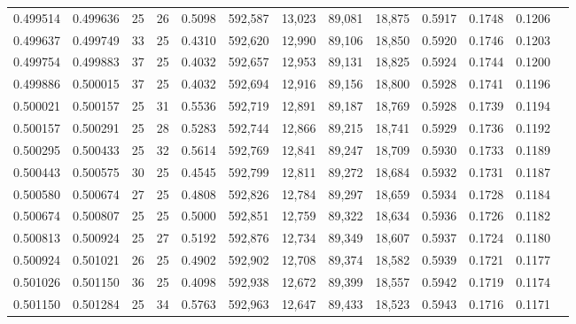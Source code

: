 \begin{tabular}{rrrrrrrrrrrrr}
0.499514 & 0.499636 &    25 &  26 &                                     0.5098 & 592,587 &  13,023 &  89,081 &  18,875 & 0.5917 & 0.1748 & 0.1206 \\
0.499637 & 0.499749 &    33 &  25 &                                     0.4310 & 592,620 &  12,990 &  89,106 &  18,850 & 0.5920 & 0.1746 & 0.1203 \\
0.499754 & 0.499883 &    37 &  25 &                                     0.4032 & 592,657 &  12,953 &  89,131 &  18,825 & 0.5924 & 0.1744 & 0.1200 \\
0.499886 & 0.500015 &    37 &  25 &                                     0.4032 & 592,694 &  12,916 &  89,156 &  18,800 & 0.5928 & 0.1741 & 0.1196 \\
0.500021 & 0.500157 &    25 &  31 &                                     0.5536 & 592,719 &  12,891 &  89,187 &  18,769 & 0.5928 & 0.1739 & 0.1194 \\
0.500157 & 0.500291 &    25 &  28 &                                     0.5283 & 592,744 &  12,866 &  89,215 &  18,741 & 0.5929 & 0.1736 & 0.1192 \\
0.500295 & 0.500433 &    25 &  32 &                                     0.5614 & 592,769 &  12,841 &  89,247 &  18,709 & 0.5930 & 0.1733 & 0.1189 \\
0.500443 & 0.500575 &    30 &  25 &                                     0.4545 & 592,799 &  12,811 &  89,272 &  18,684 & 0.5932 & 0.1731 & 0.1187 \\
0.500580 & 0.500674 &    27 &  25 &                                     0.4808 & 592,826 &  12,784 &  89,297 &  18,659 & 0.5934 & 0.1728 & 0.1184 \\
0.500674 & 0.500807 &    25 &  25 &                                     0.5000 & 592,851 &  12,759 &  89,322 &  18,634 & 0.5936 & 0.1726 & 0.1182 \\
0.500813 & 0.500924 &    25 &  27 &                                     0.5192 & 592,876 &  12,734 &  89,349 &  18,607 & 0.5937 & 0.1724 & 0.1180 \\
0.500924 & 0.501021 &    26 &  25 &                                     0.4902 & 592,902 &  12,708 &  89,374 &  18,582 & 0.5939 & 0.1721 & 0.1177 \\
0.501026 & 0.501150 &    36 &  25 &                                     0.4098 & 592,938 &  12,672 &  89,399 &  18,557 & 0.5942 & 0.1719 & 0.1174 \\
0.501150 & 0.501284 &    25 &  34 &                                     0.5763 & 592,963 &  12,647 &  89,433 &  18,523 & 0.5943 & 0.1716 & 0.1171 \\

\end{tabular}
